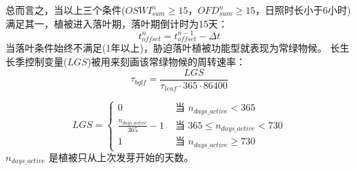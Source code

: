总而言之，当以上三个条件($OSWI_{sum}^n\geq15$，$OFD_{sum}^n\geq15$，日照时长小于6小时)满足其一，植被进入落叶期，落叶期倒计时为15天：
\begin{equation}
t_{offset}^{n}=t_{offset}^{n-1}-\Delta t
\end{equation}
当落叶条件始终不满足(1年以上)，胁迫落叶植被功能型就表现为常绿物候。
长生长季控制变量($LGS$)被用来刻画该常绿物候的周转速率：
\begin{equation}
\tau_{b g l f}=\frac{L G S}{\tau_{leaf} \cdot 365 \cdot 86400}
\end{equation}

\begin{equation}
L G S=\left\{\begin{array}{cc}0 &  \text{ 当 } n_{ {days}\_{active}}<365 \\ 
\frac{n_{ {days\_{active}}}}{365}-1 &  \text{ 当 } 365 \leq n_{ {days }\_{active} }<730 \\ 
1 & \text{ 当 } n_{ {days}\_{active}} \geq 730
\end{array}\right.
\end{equation}
$n_{days\_{active}}$ 是植被只从上次发芽开始的天数。


